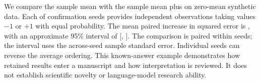We compare the sample mean with the sample mean plus  on
zero-mean synthetic data. Each of  confirmation seeds
provides  independent observations taking values $-1$ or
$+1$ with equal probability. The mean paired increase in squared error is
, with an approximate 95\% interval of
[, ]. The comparison is paired within
seeds; the interval uses the across-seed sample standard error. Individual seeds
can reverse the average ordering. This known-answer example demonstrates how
retained results enter a manuscript and how interpretation is reviewed. It does
not establish scientific novelty or language-model research ability.
